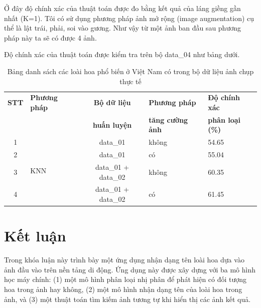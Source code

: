 \documentclass[12pt]{report}
\begin{document}
		Ở đây độ chính xác của thuật toán được đo bằng kết quả của láng giềng gần nhất (K=1). Tôi có sử dụng phương pháp ảnh mở rộng (image augmentation) cụ thể là lật trái, phải, soi vào gương. Như vậy từ một ảnh ban đầu sau phương pháp này ta sẽ có được 4 ảnh.
		
		Độ chính xác của thuật toán được kiểm tra trên bộ data\_04 như bảng dưới.

		\begin{table}[h]
			\centering
			\caption{Bảng danh sách các loài hoa phổ biến ở Việt Nam có trong bộ dữ liệu ảnh chụp thực tế}
			\label{tbl:table ket qua cua Nilsback08}
			\begin{tabular}{|c|l|c|l|l|}
				\hline
				\textbf{STT} 	& \textbf{Phương pháp} 	&\textbf{Bộ dữ liệu}	&\textbf{Phương pháp} 	& \textbf{Độ chính xác} \\ 
					 	&  			&\textbf{huấn luyện}	&\textbf{tăng cường ảnh} & \textbf{phân loại (\%)} \\ \hline

				
				1		& \multirow{4}{*}{KNN} 	& data\_01 			& không		& 54.65 \\ \cline{1} \cline{3-5}
				2		&			& data\_01 			& có		& 55.04	\\ \cline{3-5}
				3		&			& data\_01 + data\_02 		& không		& 60.35	\\ \cline{3-5}
				4		&			& data\_01 + data\_02		& có		& 61.45	\\ \hline
			\end{tabular}
		\end{table}









																																																								
		\chapter{Kết luận}
		\label{chap:conclusion}
																																																								
		Trong khóa luận này trình bày một ứng dụng nhận dạng tên loài hoa dựa vào ảnh đầu vào trên nền tảng di động. Ứng dụng này được xây dựng với ba mô hình học máy chính: (1) một mô hình phân loại nhị phân để phát hiện có đối tượng hoa trong ảnh hay không, (2) một mô hình nhận dạng tên của loài hoa trong ảnh, và (3) một thuật toán tìm kiếm ảnh tương tự khi hiển thị các ảnh kết quả. 
																																																								
\end{document}
